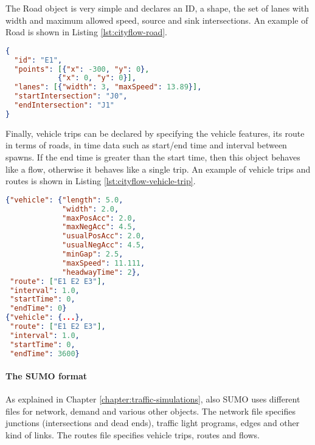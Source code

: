 The Road object is very simple and declares an ID, a shape, the set of lanes with width and maximum allowed speed, source and sink intersections.
An example of Road is shown in Listing \ref{lst:cityflow-road}.

\noindent
\begin{minipage}{\linewidth}
\begin{lstlisting}[language=JSON, caption=Example of road declaration in CityFlow format, label={lst:cityflow-road}]
{
  "id": "E1",
  "points": [{"x": -300, "y": 0},
            {"x": 0, "y": 0}],
  "lanes": [{"width": 3, "maxSpeed": 13.89}],
  "startIntersection": "J0",
  "endIntersection": "J1"
}
\end{lstlisting}
\end{minipage}

Finally, vehicle trips can be declared by specifying the vehicle features, its route in terms of roads, in time data such as start/end time and interval between spawns. If the end time is greater than the start time, then this object behaves like a flow, otherwise it behaves like a single trip.
An example of vehicle trips and routes is shown in Listing \ref{lst:cityflow-vehicle-trip}.

\noindent
\begin{minipage}{\linewidth}
\begin{lstlisting}[language=JSON, caption=Example of vehicle trip and route declaration in CityFlow format, label={lst:cityflow-vehicle-trip}]
{"vehicle": {"length": 5.0,
             "width": 2.0,
             "maxPosAcc": 2.0,
             "maxNegAcc": 4.5,
             "usualPosAcc": 2.0,
             "usualNegAcc": 4.5,
             "minGap": 2.5,
             "maxSpeed": 11.111,
             "headwayTime": 2},
 "route": ["E1 E2 E3"],
 "interval": 1.0,
 "startTime": 0,
 "endTime": 0}
{"vehicle": {...},
 "route": ["E1 E2 E3"],
 "interval": 1.0,
 "startTime": 0,
 "endTime": 3600}
\end{lstlisting}
\end{minipage}

\paragraph{The SUMO format}

As explained in Chapter \ref{chapter:traffic-simulations}, also SUMO uses different files for network, demand and various other objects.
The network file specifies junctions (intersections and dead ends), traffic light programs, edges and other kind of links.
The routes file specifies vehicle trips, routes and flows.

